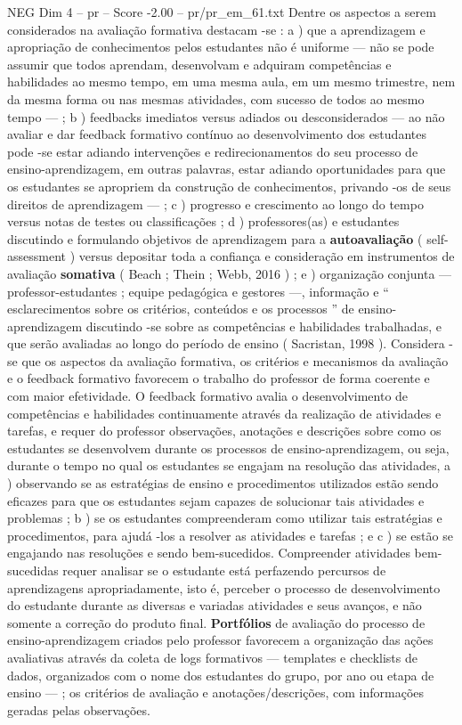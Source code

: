 \begin{textsample}{NEG Dim 4 – pr – Score -2.00 – pr/pr\_em\_61.txt}
Dentre os aspectos a serem considerados na avaliação formativa destacam -se : a ) que a aprendizagem e apropriação de conhecimentos pelos estudantes não é uniforme — não se pode assumir que todos aprendam, desenvolvam e adquiram competências e habilidades ao mesmo tempo, em uma mesma aula, em um mesmo trimestre, nem da mesma forma ou nas mesmas atividades, com sucesso de todos ao mesmo tempo — ; b ) feedbacks imediatos versus adiados ou desconsiderados — ao não avaliar e dar feedback formativo contínuo ao desenvolvimento dos estudantes pode -se estar adiando intervenções e redirecionamentos do seu processo de ensino-aprendizagem, em outras palavras, estar adiando oportunidades para que os estudantes se apropriem da construção de conhecimentos, privando -os de seus direitos de aprendizagem — ; c ) progresso e crescimento ao longo do tempo versus notas de testes ou classificações ; d ) professores(as) e estudantes discutindo e formulando objetivos de aprendizagem para a \textbf{autoavaliação} ( self-assessment ) versus depositar toda a confiança e consideração em instrumentos de avaliação \textbf{somativa} ( Beach ; Thein ; Webb, 2016 ) ; e ) organização conjunta — professor-estudantes ; equipe pedagógica e gestores —, informação e “ esclarecimentos sobre os critérios, conteúdos e os processos ” de ensino-aprendizagem discutindo -se sobre as competências e habilidades trabalhadas, e que serão avaliadas ao longo do período de ensino ( Sacristan, 1998 ).
Considera -se que os aspectos da avaliação formativa, os critérios e mecanismos da avaliação e o feedback formativo favorecem o trabalho do professor de forma coerente e com maior efetividade.
O feedback formativo avalia o desenvolvimento de competências e habilidades continuamente através da realização de atividades e tarefas, e requer do professor observações, anotações e descrições sobre como os estudantes se desenvolvem durante os processos de ensino-aprendizagem, ou seja, durante o tempo no qual os estudantes se engajam na resolução das atividades, a ) observando se as estratégias de ensino e procedimentos utilizados estão sendo eficazes para que os estudantes sejam capazes de solucionar tais atividades e problemas ; b ) se os estudantes compreenderam como utilizar tais estratégias e procedimentos, para ajudá -los a resolver as atividades e tarefas ; e c ) se estão se engajando nas resoluções e sendo bem-sucedidos.
Compreender atividades bem-sucedidas requer analisar se o estudante está perfazendo percursos de aprendizagens apropriadamente, isto é, perceber o processo de desenvolvimento do estudante durante as diversas e variadas atividades e seus avanços, e não somente a correção do produto final. \textbf{Portfólios} de avaliação do processo de ensino-aprendizagem criados pelo professor favorecem a organização das ações avaliativas através da coleta de logs formativos — templates e checklists de dados, organizados com o nome dos estudantes do grupo, por ano ou etapa de ensino — ; os critérios de avaliação e anotações/descrições, com informações geradas pelas observações.

\end{textsample}
